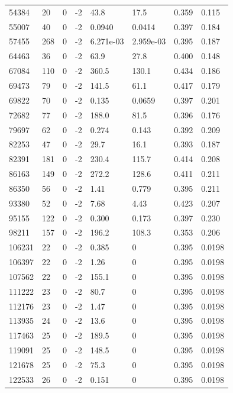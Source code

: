 \documentclass[preview]{standalone}
\begin{document}
{{{{{{{\begin{tabular}{L{1.2cm}C{1.2cm} C{0.3cm}C{0.5cm} C{1.4cm}C{1.4cm} C{1.4cm}C{1.4cm}}
  54384  &    20  & 0     & -2 &  43.8  & 17.5  & 0.359 &  0.115   \\ 
  55007  &    40  & 0     & -2 &  0.0940  & 0.0414  & 0.397 &  0.184   \\ 
  57455  &   268  & 0     & -2 &  6.271e-03  & 2.959e-03  & 0.395 &  0.187   \\ 
  64463  &    36  & 0     & -2 &  63.9  & 27.8  & 0.400 &  0.148   \\ 
  67084  &   110  & 0     & -2 &  360.5  & 130.1  & 0.434 &  0.186   \\ 
  69473  &    79  & 0     & -2 &  141.5  & 61.1  & 0.417 &  0.179   \\ 
  69822  &    70  & 0     & -2 &  0.135  & 0.0659  & 0.397 &  0.201   \\ 
  72682  &    77  & 0     & -2 &  188.0  & 81.5  & 0.396 &  0.176   \\ 
  79697  &    62  & 0     & -2 &  0.274  & 0.143  & 0.392 &  0.209   \\ 
  82253  &    47  & 0     & -2 &  29.7  & 16.1  & 0.393 &  0.187   \\ 
  82391  &   181  & 0     & -2 &  230.4  & 115.7  & 0.414 &  0.208   \\ 
  86163  &   149  & 0     & -2 &  272.2  & 128.6  & 0.411 &  0.211   \\ 
  86350  &    56  & 0     & -2 &  1.41  & 0.779  & 0.395 &  0.211   \\ 
  93380  &    52  & 0     & -2 &  7.68  & 4.43  & 0.423 &  0.207   \\ 
  95155  &   122  & 0     & -2 &  0.300  & 0.173  & 0.397 &  0.230   \\ 
  98211  &   157  & 0     & -2 &  196.2  & 108.3  & 0.353 &  0.206   \\ 
  106231  &    22  & 0     & -2 &  0.385  & 0  & 0.395 &  0.0198   \\ 
  106397  &    22  & 0     & -2 &  1.26  & 0  & 0.395 &  0.0198   \\ 
  107562  &    22  & 0     & -2 &  155.1  & 0  & 0.395 &  0.0198   \\ 
  111222  &    23  & 0     & -2 &  80.7  & 0  & 0.395 &  0.0198   \\ 
  112176  &    23  & 0     & -2 &  1.47  & 0  & 0.395 &  0.0198   \\ 
  113935  &    24  & 0     & -2 &  13.6  & 0  & 0.395 &  0.0198   \\ 
  117463  &    25  & 0     & -2 &  189.5  & 0  & 0.395 &  0.0198   \\ 
  119091  &    25  & 0     & -2 &  148.5  & 0  & 0.395 &  0.0198   \\ 
  121678  &    25  & 0     & -2 &  75.3  & 0  & 0.395 &  0.0198   \\ 
  122533  &    26  & 0     & -2 &  0.151  & 0  & 0.395 &  0.0198   \\ 
\hline 
\end{tabular} 

}}}}}}}
\end{document}
